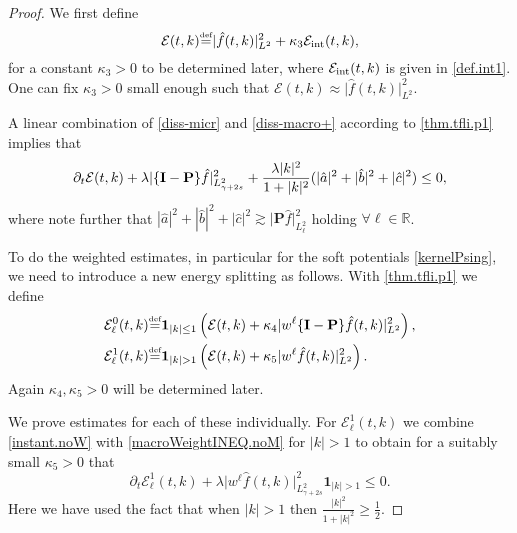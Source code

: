 \documentclass{amsart}
\numberwithin{equation}{section}
\begin{document}
\begin{proof}
We first define 
\begin{equation}\label{thm.tfli.p1}
    {\mathcal{E}}(t,k){\overset{\mbox{\tiny{def}}}{=}} {|}\hat{f}(t,k){|}_{L^2}^2
    +\kappa_3 {\mathcal{E}}_{\rm int}(t,k),
\end{equation}
for a constant $\kappa_3>0$ to be determined later, where ${\mathcal{E}}_{\rm int}(t,k)$ is given in \eqref{def.int1}. 
One can fix $\kappa_3>0$ small enough such that 
$
{\mathcal{E}}(t,k)\approx {|}\hat{f}(t,k){|}_{L^2}^2.
$

A linear combination of \eqref{diss-micr} and \eqref{diss-macro+} according to \eqref{thm.tfli.p1}  implies  that
\begin{equation}\label{instant.noW}
{\displaystyle}{\partial}_t {\mathcal{E}}(t,k)+{\lambda} {|}\{{\mathbf{I}}-{\mathbf{P}}\}\hat{f}{|}_{L^2_{\gamma+2s}}^2
+\frac{{\lambda} |k|^2}{1+|k|^2}(|\hat{a}|^2
+|\hat{b}|^2+|\hat{c}|^2)
\le 0,
\end{equation}
where note further that 
$
|\hat{a}|^2+|\hat{b}|^2+|\hat{c}|^2
\gtrsim
{|}
{\mathbf{P}} \hat{f}{|}_{L^2_{\ell}}^2 
$
holding $\forall {\ell}\in {\mathbb{R}}$.

To do the weighted estimates, in particular for the soft potentials \eqref{kernelPsing}, we need to introduce a new energy splitting as follows.
With \eqref{thm.tfli.p1} we define 
\begin{equation}\notag
\begin{split}
    {\mathcal{E}}_{\ell}^0(t,k){\overset{\mbox{\tiny{def}}}{=}} &
    { {\mathbf 1}}_{|k|\le 1} \left(
    {\mathcal{E}}(t,k)
    +\kappa_4  {|} w^{\ell}\{{\mathbf{I}}-{\mathbf{P}}\}\hat{f}(t,k){|}_{L^2}^2 \right),
    \\
        {\mathcal{E}}_{\ell}^1(t,k){\overset{\mbox{\tiny{def}}}{=}} &
    { {\mathbf 1}}_{|k|> 1} \left(
    {\mathcal{E}}(t,k)
    +\kappa_5  {|} w^{\ell}\hat{f}(t,k){|}_{L^2}^2 \right).
    \end{split}
\end{equation}
Again $ \kappa_4, \kappa_5>0$ will be determined later.

We prove estimates for each of these individually.  For ${\mathcal{E}}^1_{\ell}(t,k)$ we combine \eqref{instant.noW} with \eqref{macroWeightINEQ.noM} for $|k|> 1$ to  obtain for a suitably small $\kappa_5>0$  that
$$
\partial_t  \mathcal{E}^1_{\ell}(t,k) 
+ {\lambda}  {|} w^{\ell}  \hat{f}(t,k){|}_{L^2_{\gamma + 2s}}^2 { {\mathbf 1}}_{|k|> 1} 
\le 0.
$$
Here we have used the fact that when $|k|> 1$ then 
$
\frac{ |k|^2}{1+|k|^2} \ge \frac{1}{2}.
$


\end{proof}
\end{document}
